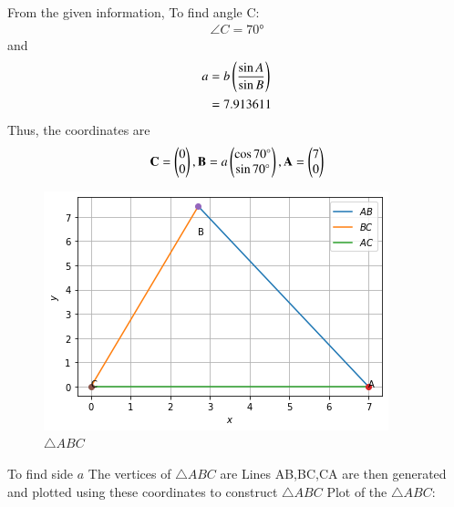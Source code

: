 From the given information, 
To find angle C:
\begin{align}
\angle{C} = \ang{70}
\end{align}
and 
\begin{align}
  a&= b\left(\frac{\sin{A}}{\sin{B}}\right) 
\\
  &= 7.913611
  \end{align}
%  
Thus, the coordinates are 
\begin{align}
  \mathbf{C} =\begin{pmatrix}0 \\ 0\end{pmatrix},
  \mathbf{B} =a\begin{pmatrix}\cos{\ang{70}} \\ \sin{\ang{70}}\end{pmatrix},
  \mathbf{A} =\begin{pmatrix}7 \\ 0\end{pmatrix}
  \end{align}
  
\begin{figure}[!h]
\centering
\includegraphics[width=\columnwidth]{solutions/july/2/4/Figure 1.jpeg}
\caption{$\triangle ABC$}
\label{fig:triangle}	
\end{figure}
To find side $a$
The vertices of $\triangle ABC$ are
Lines AB,BC,CA are then generated and plotted using these coordinates to construct $\triangle ABC$
Plot of the $\triangle ABC$:


